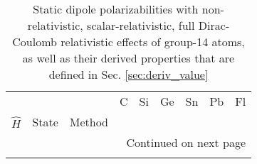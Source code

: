 \begin{longtable}{lllllllll}
\caption{Static dipole polarizabilities with non-relativistic, scalar-relativistic, full Dirac-Coulomb relativistic effects of group-14 atoms, as well as their derived properties that are defined in Sec. \ref{sec:deriv_value}}\label{tab:dipole_group_14}\\
\toprule
      &       &                                    &             C &             Si &          Ge &          Sn &          Pb &          Fl \\
$\hat{H}$ & State & Method &               &                &             &             &             &             \\
\midrule
\endhead
\midrule
\multicolumn{9}{r}{{Continued on next page}} \\
\midrule
\endfoot


\end{longtable}
